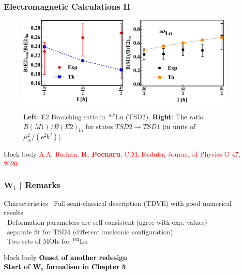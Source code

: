\documentclass{beamer}
\begin{document}
\begin{frame}
	\frametitle{Electromagnetic Calculations II}
	\begin{figure}
		\centering
		\includegraphics[width=0.49\textwidth]{figures/BE2inout-3.pdf}
		\includegraphics[width=0.48\textwidth]{figures/BE2inout-4.pdf}
		\caption{\textbf{Left}: E2 Branching ratio in $^{167}$Lu (TSD2). \textbf{Right}: The ratio $B(M1)/B(E2)_\text{in}$ for states $TSD2 \to TSD1$ (in units of $\mu_N^2/(\mathrm{e}^2b^2)$).}
	\end{figure}
	\begin{beamercolorbox}[rounded=true,shadow=false, wd=\linewidth,]{block body}
		\centering
		\textcolor{red}{\footnotesize{A.A. Raduta, \textbf{R. Poenaru}, C.M. Raduta, Journal of Physics G 47, 2020.}}
	\end{beamercolorbox}
\end{frame}

\begin{frame}
	\frametitle{$\mathbf{W}_1$ | Remarks}
	\begin{exampleblock}{Characteristics}
		\faPlus\ Full semi-classical description (TDVE) with good numerical results\\
		\faPlus\ Deformation parameters are self-consistent (agree with exp. values)\\
		\faMinus\ separate fit for TSD4 (different nucleonic configuration)\\
		\faMinus\ Two sets of MOIs for $^{163}$Lu
	\end{exampleblock}
	\vspace{0.4cm}
	\begin{beamercolorbox}[rounded=true,shadow=false, wd=\linewidth,]{block body}
		\centering
		\textcolor{black}{\small{\textbf{Onset of another redesign}}}\\
		\textcolor{black}{\small{\textbf{Start of $\mathbf{W}_2$ formalism in Chapter 5}}}\\
	\end{beamercolorbox}
\end{frame}
\end{document}
